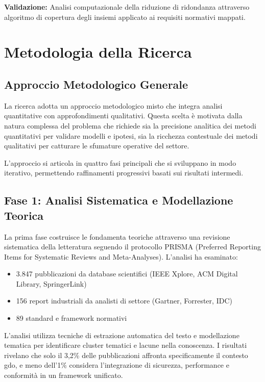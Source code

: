 \textbf{Validazione:} Analisi computazionale della riduzione di ridondanza attraverso algoritmo di copertura degli insiemi applicato ai requisiti normativi mappati.

\section{\texorpdfstring{Metodologia della Ricerca}{1.5 - Metodologia della Ricerca}}
\label{sec:metodologia}

\subsection{\texorpdfstring{Approccio Metodologico Generale}{1.5.1 - Approccio Metodologico Generale}}
\label{subsec:approccio_metodologico}

La ricerca adotta un approccio metodologico misto che integra analisi quantitative con approfondimenti qualitativi. Questa scelta è motivata dalla natura complessa del problema che richiede sia la precisione analitica dei metodi quantitativi per validare modelli e ipotesi, sia la ricchezza contestuale dei metodi qualitativi per catturare le sfumature operative del settore.

L'approccio si articola in quattro fasi principali che si sviluppano in modo iterativo, permettendo raffinamenti progressivi basati sui risultati intermedi.

\subsection{\texorpdfstring{Fase 1: Analisi Sistematica e Modellazione Teorica}{1.5.2 - Fase 1: Analisi Sistematica e Modellazione Teorica}}
\label{subsec:fase1}

La prima fase costruisce le fondamenta teoriche attraverso una revisione sistematica della letteratura seguendo il protocollo PRISMA (Preferred Reporting Items for Systematic Reviews and Meta-Analyses). L'analisi ha esaminato:
\begin{itemize}
\item 3.847 pubblicazioni da database scientifici (IEEE Xplore, ACM Digital Library, SpringerLink)
\item 156 report industriali da analisti di settore (Gartner, Forrester, IDC)
\item 89 standard e framework normativi
\end{itemize}

L'analisi utilizza tecniche di estrazione automatica del testo e modellazione tematica per identificare cluster tematici e lacune nella conoscenza. I risultati rivelano che solo il 3,2\% delle pubblicazioni affronta specificamente il contesto \gls{gdo}, e meno dell'1\% considera l'integrazione di sicurezza, performance e conformità in un framework unificato.

